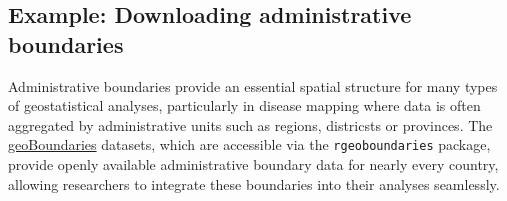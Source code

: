 \documentclass[
  letterpaper,
]{krantz}
\newenvironment{Shaded}{\begin{snugshade}}{\end{snugshade}}
\newcommand{\AttributeTok}[1]{\textcolor[rgb]{0.13,0.29,0.53}{#1}}
\newcommand{\CommentTok}[1]{\textcolor[rgb]{0.56,0.35,0.01}{\textit{#1}}}
\newcommand{\DecValTok}[1]{\textcolor[rgb]{0.00,0.00,0.81}{#1}}
\newcommand{\FunctionTok}[1]{\textcolor[rgb]{0.13,0.29,0.53}{\textbf{#1}}}
\newcommand{\NormalTok}[1]{#1}
\newcommand{\OtherTok}[1]{\textcolor[rgb]{0.56,0.35,0.01}{#1}}
\newcommand{\SpecialCharTok}[1]{\textcolor[rgb]{0.81,0.36,0.00}{\textbf{#1}}}
\newcommand{\StringTok}[1]{\textcolor[rgb]{0.31,0.60,0.02}{#1}}
\begin{document}
\subsection{Example: Downloading administrative
boundaries}\label{example-downloading-administrative-boundaries}

Administrative boundaries provide an essential spatial structure for
many types of geostatistical analyses, particularly in disease mapping
where data is often aggregated by administrative units such as regions,
districsts or provinces. The
\href{https://www.geoboundaries.org/}{geoBoundaries} datasets, which are
accessible via the \texttt{rgeoboundaries} package, provide openly
available administrative boundary data for nearly every country,
allowing researchers to integrate these boundaries into their analyses
seamlessly.

\begin{Shaded}
\end{Shaded}
\end{document}
